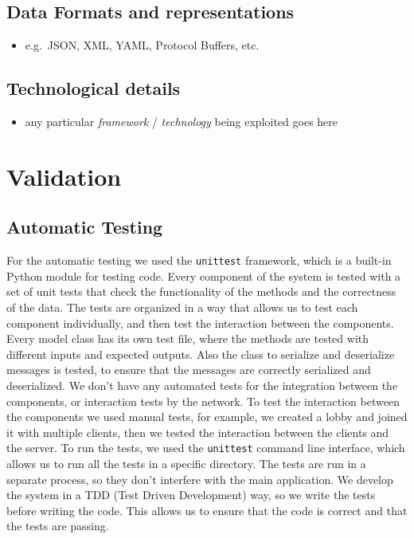\documentclass{scrartcl}
\begin{document}
\subsection{Data Formats and representations}\label{data-formats}

\begin{itemize}
      \item e.g.~JSON, XML, YAML, Protocol Buffers, etc.
\end{itemize}

\subsection{Technological details}\label{technological-details}

\begin{itemize}
      \item any particular \emph{framework} / \emph{technology} being exploited
            goes here
\end{itemize}

\section{Validation}\label{validation}

\subsection{Automatic Testing}\label{automatic-testing}
For the automatic testing we used the \texttt{unittest} framework, which is a built-in Python module for testing code. Every component of the system is tested with a set of unit tests that check the functionality of the methods and the correctness of the data. \newline
The tests are organized in a way that allows us to test each component individually, and then test the interaction between the components. \newline
Every model class has its own test file, where the methods are tested with different inputs and expected outputs. Also the class to serialize and deserialize messages is tested, to ensure that the messages are correctly serialized and deserialized. \newline
We don't have any automated tests for the integration between the components, or interaction tests by the network. To test the interaction between the components we used manual tests, for example, we created a lobby and joined it with multiple clients, then we tested the interaction between the clients and the server. \newline
To run the tests, we used the \texttt{unittest} command line interface, which allows us to run all the tests in a specific directory. The tests are run in a separate process, so they don't interfere with the main application. \newline
We develop the system in a TDD (Test Driven Development) way, so we write the tests before writing the code. This allows us to ensure that the code is correct and that the tests are passing. \newline
\end{document}
